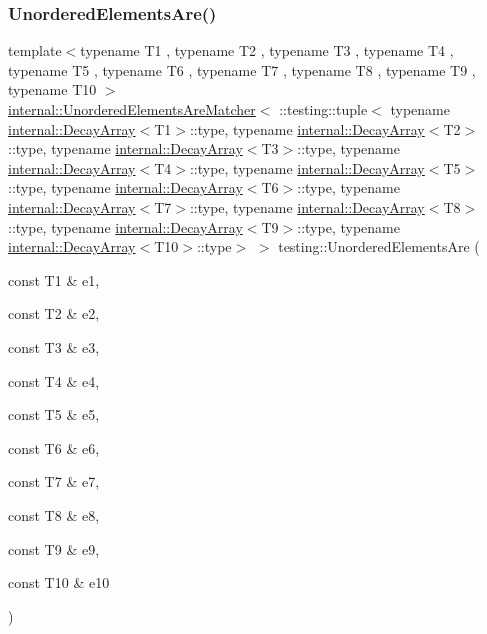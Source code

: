 \subsubsection{\texorpdfstring{Unordered\+Elements\+Are()}{UnorderedElementsAre()}\hspace{0.1cm}{\footnotesize\ttfamily [11/11]}}
{\footnotesize\ttfamily template$<$typename T1 , typename T2 , typename T3 , typename T4 , typename T5 , typename T6 , typename T7 , typename T8 , typename T9 , typename T10 $>$ \\
\hyperlink{classtesting_1_1internal_1_1UnorderedElementsAreMatcher}{internal\+::\+Unordered\+Elements\+Are\+Matcher}$<$ \+::testing\+::tuple$<$ typename \hyperlink{structtesting_1_1internal_1_1DecayArray}{internal\+::\+Decay\+Array}$<$T1$>$\+::type, typename \hyperlink{structtesting_1_1internal_1_1DecayArray}{internal\+::\+Decay\+Array}$<$T2$>$\+::type, typename \hyperlink{structtesting_1_1internal_1_1DecayArray}{internal\+::\+Decay\+Array}$<$T3$>$\+::type, typename \hyperlink{structtesting_1_1internal_1_1DecayArray}{internal\+::\+Decay\+Array}$<$T4$>$\+::type, typename \hyperlink{structtesting_1_1internal_1_1DecayArray}{internal\+::\+Decay\+Array}$<$T5$>$\+::type, typename \hyperlink{structtesting_1_1internal_1_1DecayArray}{internal\+::\+Decay\+Array}$<$T6$>$\+::type, typename \hyperlink{structtesting_1_1internal_1_1DecayArray}{internal\+::\+Decay\+Array}$<$T7$>$\+::type, typename \hyperlink{structtesting_1_1internal_1_1DecayArray}{internal\+::\+Decay\+Array}$<$T8$>$\+::type, typename \hyperlink{structtesting_1_1internal_1_1DecayArray}{internal\+::\+Decay\+Array}$<$T9$>$\+::type, typename \hyperlink{structtesting_1_1internal_1_1DecayArray}{internal\+::\+Decay\+Array}$<$T10$>$\+::type$>$ $>$ testing\+::\+Unordered\+Elements\+Are (\begin{DoxyParamCaption}\item[{const T1 \&}]{e1,  }\item[{const T2 \&}]{e2,  }\item[{const T3 \&}]{e3,  }\item[{const T4 \&}]{e4,  }\item[{const T5 \&}]{e5,  }\item[{const T6 \&}]{e6,  }\item[{const T7 \&}]{e7,  }\item[{const T8 \&}]{e8,  }\item[{const T9 \&}]{e9,  }\item[{const T10 \&}]{e10 }\end{DoxyParamCaption})\hspace{0.3cm}{\ttfamily [inline]}}



